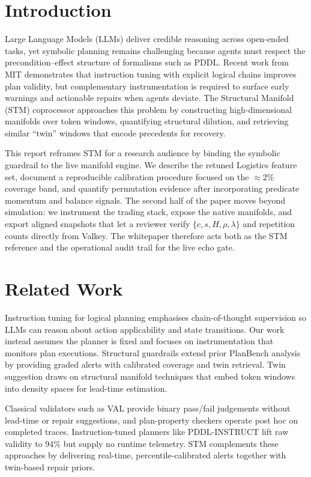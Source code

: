 \documentclass[11pt]{article}
\begin{document}
\section{Introduction}
Large Language Models (LLMs) deliver credible reasoning across open-ended
tasks, yet symbolic planning remains challenging because agents must respect the
precondition--effect structure of formalisms such as PDDL. Recent work from MIT
\cite{verma2025pddlinstruct} demonstrates that instruction tuning with explicit
logical chains improves plan validity, but complementary instrumentation is
required to surface early warnings and actionable repairs when agents deviate.
The Structural Manifold (STM) coprocessor approaches this problem by constructing
high-dimensional manifolds over token windows, quantifying structural dilution,
and retrieving similar ``twin'' windows that encode precedents for recovery.

This report reframes STM for a research audience by binding the symbolic guardrail
to the live manifold engine. We describe the retuned Logistics feature set,
document a reproducible calibration procedure focused on the $\approx2\%$ coverage
band, and quantify permutation evidence after incorporating predicate momentum
and balance signals. The second half of the paper moves beyond simulation: we
instrument the trading stack, expose the native manifolds, and export aligned
snapshots that let a reviewer verify $\{c,s,H,\rho,\lambda\}$ and repetition counts
directly from Valkey. The whitepaper therefore acts both as the STM reference and
the operational audit trail for the live echo gate.

\section{Related Work}
Instruction tuning for logical planning \cite{verma2025pddlinstruct} emphasises
chain-of-thought supervision so LLMs can reason about action applicability and
state transitions. Our work instead assumes the planner is fixed and focuses on
instrumentation that monitors plan executions. Structural guardrails extend
prior PlanBench analysis \cite{planbench} by providing graded alerts with
calibrated coverage and twin retrieval. Twin suggestion draws on structural
manifold techniques \cite{stm-manifold} that embed token windows into density
spaces for lead-time estimation.

Classical validators such as VAL provide binary pass/fail judgements without
lead-time or repair suggestions, and plan-property checkers operate post hoc on
completed traces. Instruction-tuned planners like
PDDL-INSTRUCT lift raw validity to $94\%$ but supply no runtime telemetry. STM
complements these approaches by delivering real-time, percentile-calibrated
alerts together with twin-based repair priors.
\end{document}
